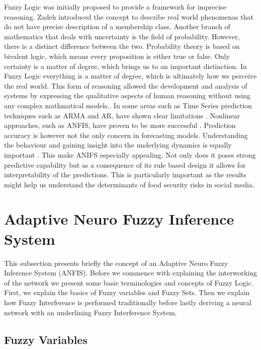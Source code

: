 Fuzzy Logic was initially proposed to provide a framework for imprecise reasoning. Zadeh \cite{Zadeh65} introduced the concept to describe real world phenomenas that do not have precise description of a membership class. Another branch of mathematics that deals with uncertainty is the field of probability. However, there is a distinct difference between the two. Probability theory is based on bivalent logic, which means every proposition is either true or false. Only certainty is a matter of degree, which brings us to an important distinction. In Fuzzy Logic everything is a matter of degree, which is ultimately how we perceive the real world. This form of reasoning allowed the development and analysis of  systems by expressing the qualitative aspects of human reasoning without using any complex mathmatical models.\cite{Jang91}.  
In some areas such as Time Series prediction techniques such as ARMA and AR, have shown clear limitations \cite{box90}. Nonlinear approaches, such as ANFIS, have proven to be more successful \cite{chap04}. Prediction accuracy is however not the only concern in forecasting models. Understanding the behaviour and gaining insight into the underlying dynamics is equally important \cite{neil93}. This make ANIFS especially appealing. Not only does it poses strong predictive capability but as a consequence of its rule based design it allows for interpretability of the predictions. This is particularly important as the results might help us understand the determinants of food security risks in social media. 

\section{Adaptive Neuro Fuzzy Inference System }

This subsection presents briefly the concept of an Adaptive Neuro Fuzzy Inference System (ANFIS). Before we commence with explaining the interworking of the network we present some basic terminologies and concepts of Fuzzy Logic. First, we explain the basics of Fuzzy variables and Fuzzy Sets. Then  we explain how Fuzzy Interference is performed traditionally before lastly deriving a neural network with an underlining Fuzzy Interference System. 

\subsection {Fuzzy Variables }

